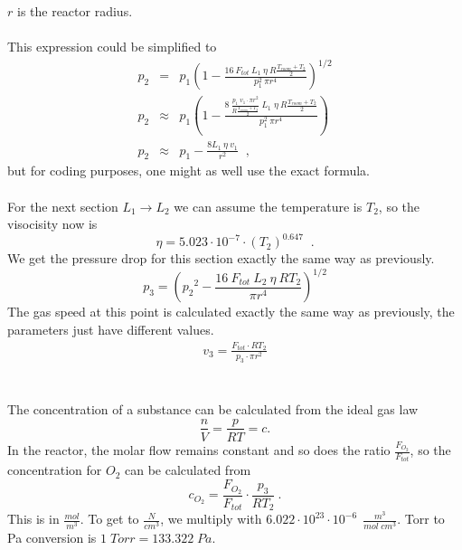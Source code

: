 \documentclass[10pt, a4paper]{article}
\begin{document}
$r$ is the reactor radius. 
\\
\\
This expression could be simplified to 
\begin{eqnarray*}
p_2 &=& p_1\left(  1 - \frac{16\:F_{tot} \: L_1 \: \eta \: R\frac{T_{room} + T_2}{2}}{p_1^2 \: \pi r^4} \right)^{1/2} \\
p_2 &\approx & p_1 \left( 1 - \frac{8\:\frac{p_1\; v_1 \cdot \pi r^2}{R \frac{T_{room} + T_2}{2} } \: L_1 \; \eta \: R\frac{T_{room} + T_2}{2}}{p_1^2 \: \pi r^4} \right) \\
p_2 &\approx & p_1 - \frac{8L_1 \: \eta \: v_1}{r^2} \;\;,
\end{eqnarray*}
but for coding purposes, one might as well use the exact formula. 
\\
\\
For the next section $L_1 \rightarrow L_2$ we can assume the temperature is $T_2$, so the visocisity now is 
\begin{equation*}
\eta = 5.023\cdot 10^{-7} \cdot \left(T_2 \right)^{0.647}  \;\;. 
\end{equation*}
We get the pressure drop for this section exactly the same way as previously. 
\begin{equation*}
p_3 = \left( {p_2}^2 - \frac{16\:F_{tot} \: L_2 \: \eta \: RT_2}{\pi r^4} \right)^{1/2}
\end{equation*}
The gas speed at this point is calculated exactly the same way as previously, the parameters just have different values. 
\begin{eqnarray*}
v_3 = \frac{F_{tot} \cdot RT_2}{p_3 \cdot \pi r^2}
\end{eqnarray*}
\\
\\
The concentration of a substance can be calculated from the ideal gas law 
\begin{equation*}
\frac{n}{V} = \frac{p}{RT} = c. 
\end{equation*}
In the reactor, the molar flow remains constant and so does the ratio $ \frac{F_{O_2}}{F_{tot}}$, so the concentration for $O_2$ can be calculated from 
\begin{equation*}
c_{O_2} = \frac{F_{O_2}}{F_{tot}} \cdot \frac{p_3}{RT_2} \:. 
\end{equation*}
This is in $ \frac{mol}{m^3}$. To get to $ \frac{N}{cm^3}$, we multiply with $6.022 \cdot 10^{23} \cdot 10^{-6}\:\: \frac{m^3}{mol\;cm^3} $. 
Torr to Pa conversion is $1\;Torr = 133.322\;Pa$. 
\end{document}
